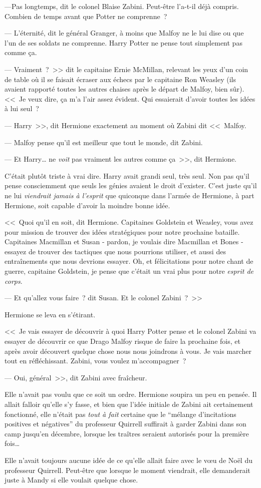 ---Pas longtemps, dit le colonel Blaise Zabini. Peut-être l'a-t-il déjà compris. Combien de temps avant que Potter ne comprenne~?

--- L'éternité, dit le général Granger, à moins que Malfoy ne le lui dise ou que l'un de ses soldats ne comprenne. Harry Potter ne pense tout simplement pas comme ça.

--- Vraiment~?~>> dit le capitaine Ernie McMillan, relevant les yeux d'un coin de table où il se faisait écraser aux échecs par le capitaine Ron Weasley (ils avaient rapporté toutes les autres chaises après le départ de Malfoy, bien sûr). <<~Je veux dire, ça m'a l'air assez évident. Qui essaierait d'avoir toutes les idées à lui seul~?

--- Harry~>>, dit Hermione exactement au moment où Zabini dit <<~Malfoy.

--- Malfoy pense qu'il est meilleur que tout le monde, dit Zabini.

--- Et Harry… ne \emph{voit} pas vraiment les autres comme ça~>>, dit Hermione.

C'était plutôt triste à vrai dire. Harry avait grandi seul, très seul. Non pas qu'il pense consciemment que seuls les génies avaient le droit d'exister. C'est juste qu'il ne lui \emph{viendrait jamais à l'esprit} que quiconque dans l'armée de Hermione, à part Hermione, soit capable d'avoir la moindre bonne idée.

<<~Quoi qu'il en soit, dit Hermione. Capitaines Goldstein et Weasley, vous avez pour mission de trouver des idées stratégiques pour notre prochaine bataille. Capitaines Macmillan et Susan - pardon, je voulais dire Macmillan et Bones - essayez de trouver des tactiques que nous pourrions utiliser, et aussi des entraînements que nous devrions essayer. Oh, et félicitations pour notre chant de guerre, capitaine Goldstein, je pense que c'était un vrai plus pour notre \emph{esprit de corps}.

--- Et qu'allez vous faire~? dit Susan. Et le colonel Zabini~?~>>

Hermione se leva en s'étirant.

<<~Je vais essayer de découvrir à quoi Harry Potter pense et le colonel Zabini va essayer de découvrir ce que Drago Malfoy risque de faire la prochaine fois, et après avoir découvert quelque chose nous nous joindrons à vous. Je vais marcher tout en réfléchissant. Zabini, vous voulez m'accompagner~?

--- Oui, général~>>, dit Zabini avec fraîcheur.

Elle n'avait pas voulu que ce soit un ordre. Hermione soupira un peu en pensée. Il allait falloir qu'elle s'y fasse, et bien que l'idée initiale de Zabini ait certainement fonctionné, elle n'était pas \emph{tout à fait} certaine que le “mélange d'incitations positives et négatives” du professeur Quirrell suffirait à garder Zabini dans son camp jusqu'en décembre, lorsque les traîtres seraient autorisés pour la première fois…

Elle n'avait toujours aucune idée de ce qu'elle allait faire avec le vœu de Noël du professeur Quirrell. Peut-être que lorsque le moment viendrait, elle demanderait juste à Mandy si elle voulait quelque chose.~
